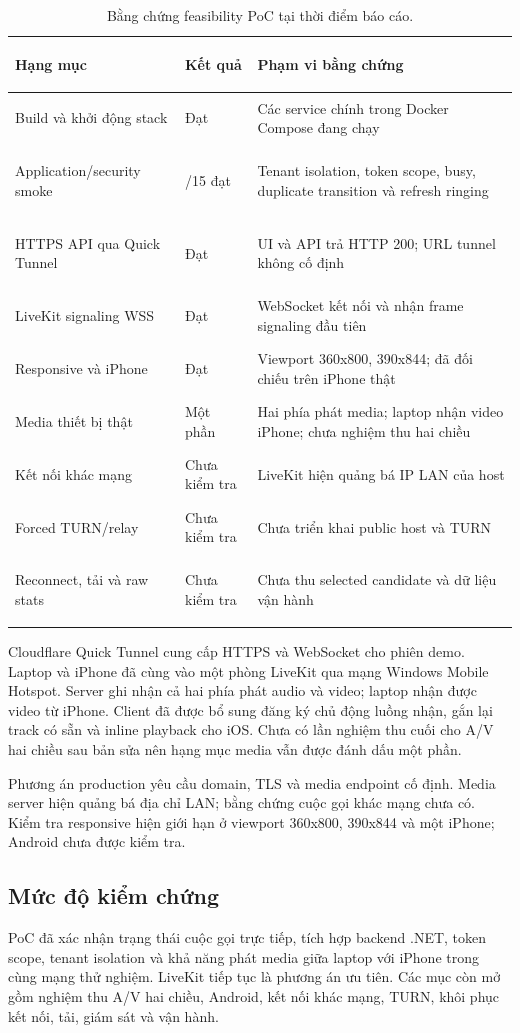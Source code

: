 \begin{table}[htbp]
\centering
\small
\begin{tabularx}{\textwidth}{|>{\bfseries\raggedright\arraybackslash}p{}|>{\raggedright\arraybackslash}p{}|>{\raggedright\arraybackslash}X|}
\hline
Hạng mục & Kết quả & Phạm vi bằng chứng \\
\hline
Build và khởi động stack & Đạt & Các service chính trong Docker Compose đang chạy \\
\hline
Application/security smoke & 15/15 đạt & Tenant isolation, token scope, busy, duplicate transition và refresh ringing \\
\hline
HTTPS API qua Quick Tunnel & Đạt & UI và API trả HTTP 200; URL tunnel không cố định \\
\hline
LiveKit signaling WSS & Đạt & WebSocket kết nối và nhận frame signaling đầu tiên \\
\hline
Responsive và iPhone & Đạt & Viewport 360x800, 390x844; đã đối chiếu trên iPhone thật \\
\hline
Media thiết bị thật & Một phần & Hai phía phát media; laptop nhận video iPhone; chưa nghiệm thu hai chiều \\
\hline
Kết nối khác mạng & Chưa kiểm tra & LiveKit hiện quảng bá IP LAN của host \\
\hline
Forced TURN/relay & Chưa kiểm tra & Chưa triển khai public host và TURN \\
\hline
Reconnect, tải và raw stats & Chưa kiểm tra & Chưa thu selected candidate và dữ liệu vận hành \\
\hline
\end{tabularx}
\caption{Bằng chứng feasibility PoC tại thời điểm báo cáo.}
\label{tab:poc-evidence}
\end{table}

Cloudflare Quick Tunnel cung cấp HTTPS và WebSocket cho phiên demo. Laptop và iPhone đã
cùng vào một phòng LiveKit qua mạng Windows Mobile Hotspot. Server ghi nhận cả hai phía
phát audio và video; laptop nhận được video từ iPhone. Client đã được bổ sung đăng ký
chủ động luồng nhận, gắn lại track có sẵn và inline playback cho iOS. Chưa có lần nghiệm
thu cuối cho A/V hai chiều sau bản sửa nên hạng mục media vẫn được đánh dấu một phần.

Phương án production
yêu cầu domain, TLS và media endpoint cố định. Media server hiện quảng bá địa chỉ LAN;
bằng chứng cuộc gọi khác mạng chưa có. Kiểm tra responsive hiện giới hạn ở viewport
360x800, 390x844 và một iPhone; Android chưa được kiểm tra.

\subsection{Mức độ kiểm chứng}

PoC đã xác nhận trạng thái cuộc gọi trực tiếp, tích hợp backend .NET, token scope, tenant
isolation và khả năng phát media giữa laptop với iPhone trong cùng mạng thử nghiệm.
LiveKit tiếp tục là phương án ưu tiên. Các mục còn mở gồm nghiệm thu A/V hai chiều,
Android, kết nối khác mạng, TURN, khôi phục kết nối, tải, giám sát và vận hành.

